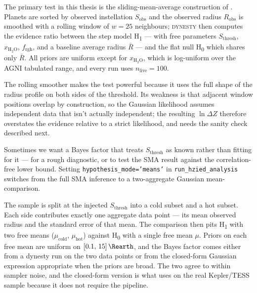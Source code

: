 \label{ssec:sma_test}

The primary test in this thesis is the sliding-mean-average
construction of \textcite{Schlecker2024}.  Planets are sorted by
observed instellation $S_\mathrm{obs}$ and the observed radius
$R_\mathrm{obs}$ is smoothed with a rolling window of $w=25$
neighbours; \textsc{dynesty} \parencite{Speagle2020} then computes
the evidence ratio between the step model H\textsubscript{1} ---
with free parameters $S_\mathrm{thresh}$, $x_{\mathrm{H_2O}}$,
$f_\mathrm{rgh}$, and a baseline average radius $\bar R$ --- and the
flat null H\textsubscript{0} which shares only $\bar R$.  All priors
are uniform except for $x_{\mathrm{H_2O}}$, which is log-uniform
over the AGNI tabulated range, and every run uses
$n_\mathrm{live}=100$.

The rolling smoother makes the test powerful because it uses the
full shape of the radius profile on both sides of the threshold.
Its weakness is that adjacent window positions overlap by
construction, so the Gaussian likelihood assumes independent data
that isn't actually independent; the resulting $\ln\Delta Z$
therefore overstates the evidence relative to a strict likelihood,
and needs the sanity check described next.


\label{ssec:hypothesis_test_methodology}

Sometimes we want a Bayes factor that treats $S_\mathrm{thresh}$ as
known rather than fitting for it --- for a rough diagnostic, or to
test the SMA result against the correlation-free lower bound.
Setting \texttt{hypothesis\_mode='means'} in
\texttt{run\_hzied\_analysis} switches from the full SMA inference
to a two-aggregate Gaussian mean-comparison.

The sample is split at the injected $S_\mathrm{thresh}$ into a cold
subset and a hot subset.  Each side contributes exactly one aggregate
data point --- its mean observed radius and the standard error of
that mean.  The comparison then pits H\textsubscript{1} with two free
means ($\mu_\mathrm{cold}$, $\mu_\mathrm{hot}$) against
H\textsubscript{0} with a single free mean $\mu$.  Priors on each free
mean are uniform on $[0.1,\,15]\,\Rearth$, and the Bayes factor comes
either from a dynesty run on the two data points or from the
closed-form Gaussian expression appropriate when the priors are
broad.  The two agree to within sampler noise, and the closed-form
version is what  uses on the real Kepler/TESS
sample because it does not require the pipeline.

